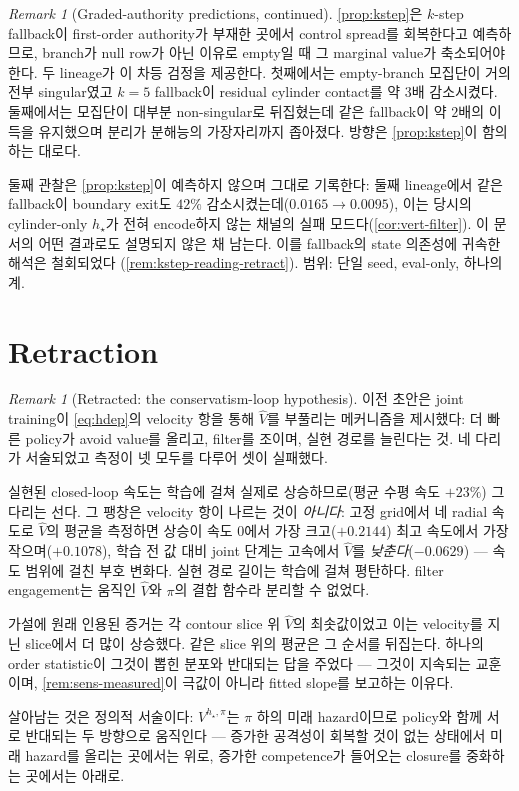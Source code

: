 \documentclass[11pt]{article}
\theoremstyle{plain}
\theoremstyle{definition}
\theoremstyle{remark}
\newtheorem{remark}[theorem]{Remark}
\newcommand{\Vhat}{\widehat V}
\begin{document}
\begin{remark}[Graded-authority predictions, continued]\label{rem:kstep-empirical-2}
\cref{prop:kstep}은 $k$-step fallback이 first-order authority가 부재한 곳에서 control spread를
회복한다고 예측하므로, branch가 null row가 아닌 이유로 empty일 때 그 marginal value가 축소되어야
한다. 두 lineage가 이 차등 검정을 제공한다. 첫째에서는 empty-branch 모집단이 거의 전부 singular였고
$k=5$ fallback이 residual cylinder contact를 약 $3$배 감소시켰다. 둘째에서는 모집단이 대부분
non-singular로 뒤집혔는데 같은 fallback이 약 $2$배의 이득을 유지했으며 분리가 분해능의 가장자리까지
좁아졌다. 방향은 \cref{prop:kstep}이 함의하는 대로다.

둘째 관찰은 \cref{prop:kstep}이 예측하지 않으며 그대로 기록한다: 둘째 lineage에서 같은 fallback이
boundary exit도 $42\%$ 감소시켰는데($0.0165\to0.0095$), 이는 당시의 cylinder-only $h_\star$가 전혀
encode하지 않는 채널의 실패 모드다(\cref{cor:vert-filter}). 이 문서의 어떤 결과로도 설명되지 않은
채 남는다. 이를 fallback의 state 의존성에 귀속한 해석은 철회되었다
(\cref{rem:kstep-reading-retract}). 범위: 단일 seed, eval-only, 하나의 계.
\end{remark}

\section{Retraction}\label{sec:retract}

\begin{remark}[Retracted: the conservatism-loop hypothesis]\label{rem:loop-retract}
이전 초안은 joint training이 \cref{eq:hdep}의 velocity 항을 통해 $\Vhat$를 부풀리는 메커니즘을
제시했다: 더 빠른 policy가 avoid value를 올리고, filter를 조이며, 실현 경로를 늘린다는 것. 네
다리가 서술되었고 측정이 넷 모두를 다루어 셋이 실패했다.

실현된 closed-loop 속도는 학습에 걸쳐 실제로 상승하므로(평균 수평 속도 $+23\%$) 그 다리는 선다. 그
팽창은 velocity 항이 나르는 것이 \emph{아니다}: 고정 grid에서 네 radial 속도로 $\Vhat$의 평균을
측정하면 상승이 속도 $0$에서 가장 크고($+0.2144$) 최고 속도에서 가장 작으며($+0.1078$), 학습 전 값
대비 joint 단계는 고속에서 $\Vhat$를 \emph{낮춘다}($-0.0629$) --- 속도 범위에 걸친 부호 변화다.
실현 경로 길이는 학습에 걸쳐 평탄하다. filter engagement는 움직인 $\Vhat$와 $\pi$의 결합 함수라
분리할 수 없었다.

가설에 원래 인용된 증거는 각 contour slice 위 $\Vhat$의 최솟값이었고 이는 velocity를 지닌 slice에서
더 많이 상승했다. 같은 slice 위의 평균은 그 순서를 뒤집는다. 하나의 order statistic이 그것이 뽑힌
분포와 반대되는 답을 주었다 --- 그것이 지속되는 교훈이며, \cref{rem:sens-measured}이 극값이 아니라
fitted slope를 보고하는 이유다.

살아남는 것은 정의적 서술이다: $V^{h_\star,\pi}$는 $\pi$ 하의 미래 hazard이므로 policy와 함께 서로
반대되는 두 방향으로 움직인다 --- 증가한 공격성이 회복할 것이 없는 상태에서 미래 hazard를 올리는
곳에서는 위로, 증가한 competence가 들어오는 closure를 중화하는 곳에서는 아래로.
\end{remark}
\end{document}

